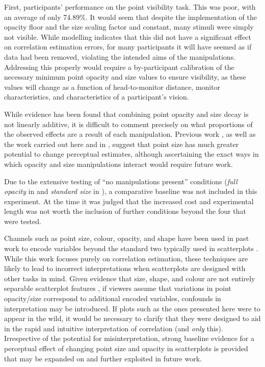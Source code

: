 \documentclass[../main.tex]{subfiles}
\begin{document}
First, participants' performance on the point visibility task. This was
poor, with an average of only 74.89\%. It would seem that despite the
implementation of the opacity floor and the size scaling factor and
constant, many stimuli were simply not visible. While modelling
indicates that this did not have a significant effect on correlation
estimation errors, for many participants it will have seemed as if data
had been removed, violating the intended aims of the manipulations.
Addressing this properly would require a by-participant calibration of
the necessary minimum point opacity and size values to ensure
visibility, as these values will change as a function of head-to-monitor
distance, monitor characteristics, and characteristics of a
participant's vision.

While evidence has been found that combining point opacity and size
decay is not linearly additive, it is difficult to comment precisely on
what proportions of the observed effects are a result of each
manipulation. Previous work \cite{hong_2022}, as well as the work
carried out here and in , suggest that point
size has much greater potential to change perceptual estimates, although
ascertaining the exact ways in which opacity and size manipulations
interact would require future work.

Due to the extensive testing of ``no manipulations present'' conditions
(\emph{full opacity} in  and \emph{standard
size} in ), a comparative baseline was not
included in this experiment. At the time it was judged that the
increased cost and experimental length was not worth the inclusion of
further conditions beyond the four that were tested.

Channels such as point size, colour, opacity, and shape have been used
in past work to encode variables beyond the standard two typically used
in scatterplots \cite{smart_2019, hong_2022}. While this work focuses
purely on correlation estimation, these techniques are likely to lead to
incorrect interpretations when scatterplots are designed with other
tasks in mind. Given evidence that size, shape, and colour are not
entirely separable scatterplot features \cite{smart_2019}, if viewers
assume that variations in point opacity/size correspond to additional
encoded variables, confounds in interpretation may be introduced. If
plots such as the ones presented here were to appear in the wild, it
would be necessary to clarify that they were designed to aid in the
rapid and intuitive interpretation of correlation (and \emph{only}
this). Irrespective of the potential for misinterpretation, strong
baseline evidence for a perceptual effect of changing point size and
opacity in scatterplots is provided that may be expanded on and further
exploited in future work.
\end{document}
